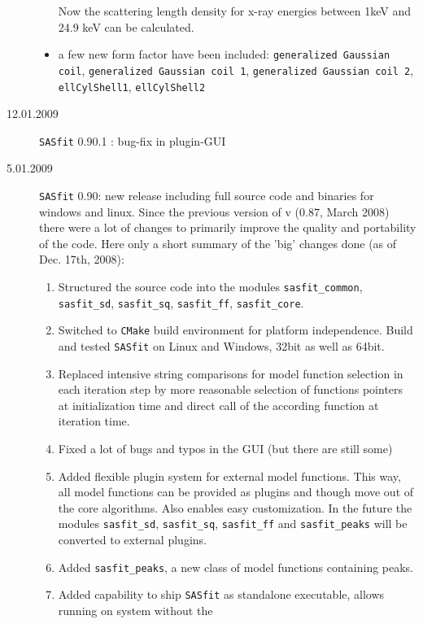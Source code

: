 \begin{description}
\begin{itemize}
                  Now the scattering length density for x-ray energies between 1keV
                  and 24.9 keV can be calculated.
            \item a few new form factor have been included:
                        \texttt{generalized Gaussian coil},
                        \texttt{generalized Gaussian coil 1},
                        \texttt{generalized Gaussian coil 2},
                        \texttt{ellCylShell1},
                        \texttt{ellCylShell2}
        \end{itemize}
    \item[12.01.2009]{\tt SASfit} 0.90.1 : bug-fix in plugin-GUI
    \item[5.01.2009] {\tt SASfit} 0.90:
    new release including full source code and binaries for
    windows and linux. Since the previous version of v (0.87, March 2008)
    there were a lot of changes to primarily improve the quality
    and portability of the code. Here only a short summary of the 'big'
    changes done (as of Dec. 17th, 2008):
    \begin{enumerate}
        \item Structured the source code into the modules \texttt{sasfit\_common}, \texttt{sasfit\_sd}, \texttt{sasfit\_sq},
                \texttt{sasfit\_ff}, \texttt{sasfit\_core}.
        \item Switched to {\tt CMake} build environment for platform independence. Build and tested {\tt SASfit} on
                Linux and Windows, 32bit as well as 64bit.
        \item Replaced intensive string comparisons for model function selection in each iteration step by more reasonable
                selection of functions pointers at initialization time and direct call of the according function at iteration time.
        \item Fixed a lot of bugs and typos in the GUI (but there are still some)
        \item Added flexible plugin system for external model functions. This way, all model functions can be provided
                as plugins and though move out of the core algorithms. Also enables easy customization. In the future
                the modules \texttt{sasfit\_sd}, \texttt{sasfit\_sq}, \texttt{sasfit\_ff} and \texttt{sasfit\_peaks}
                will be converted to external plugins.
        \item Added \texttt{sasfit\_peaks}, a new class of model functions containing peaks.
        \item Added capability to ship {\tt SASfit} as standalone executable, allows running on system without the

\end{enumerate}
\end{description}
